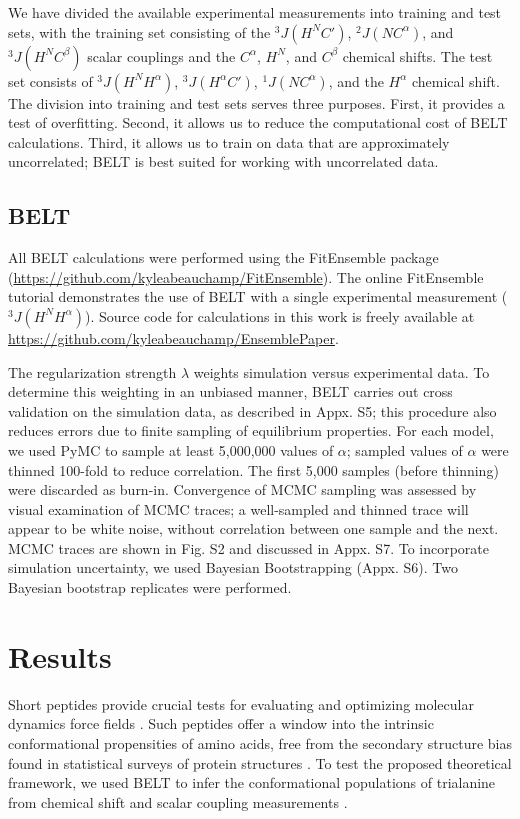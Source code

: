 \documentclass[journal=jacsat,manuscript=article]{achemso}
\begin{document}
We have divided the available experimental measurements into training and test sets, with the training set consisting of the $^3J(H^N C')$,  $^2J(N C^\alpha)$, and $^3J(H^N C^\beta)$ scalar couplings and the $C^\alpha$, $H^N$, and $C^\beta$ chemical shifts.  The test set consists of $^3J(H^N H^\alpha)$, $^3J(H^\alpha C')$, $^1J(N C^\alpha)$, and the $H^\alpha$ chemical shift.  The division into training and test sets serves three purposes.  First, it provides a test of overfitting.  Second, it allows us to reduce the computational cost of BELT calculations.  Third, it allows us to train on data that are approximately uncorrelated; BELT is best suited for working with uncorrelated data.  

\subsection*{BELT}

All BELT calculations were performed using the FitEnsemble package (\url{https://github.com/kyleabeauchamp/FitEnsemble}).  The online FitEnsemble tutorial demonstrates the use of BELT with a single experimental measurement ($^3J(H^N H^\alpha)$).  Source code for calculations in this work is freely available at \url{https://github.com/kyleabeauchamp/EnsemblePaper}.  

The regularization strength $\lambda$ weights simulation versus experimental data. To determine this weighting in an unbiased manner, BELT carries out cross validation on the simulation data, as described in Appx. S5; this procedure also reduces errors due to finite sampling of equilibrium properties.  For each model, we used PyMC to sample at least 5,000,000 values of $\alpha$; sampled values of $\alpha$ were thinned 100-fold to reduce correlation.  The first 5,000 samples (before thinning) were discarded as burn-in.  Convergence of MCMC sampling was assessed by visual examination of MCMC traces; a well-sampled and thinned trace will appear to be white noise, without correlation between one sample and the next.  MCMC traces are shown in Fig. S2 and discussed in Appx. S7.  To incorporate simulation uncertainty, we used Bayesian Bootstrapping (Appx. S6).  Two Bayesian bootstrap replicates were performed.  

\section*{Results}

Short peptides provide crucial tests for evaluating and optimizing molecular dynamics force fields  \cite{Graf2007,beauchamp2012protein, nerenberg2011, best2008, Grdadolnik2011}.  Such peptides offer a window into the intrinsic conformational propensities of amino acids, free from the secondary structure bias found in statistical surveys of protein structures  \cite{Jha2005}.  To test the proposed  theoretical framework, we used BELT to infer the conformational populations of trialanine from chemical shift and scalar coupling measurements  \cite{Graf2007}.  
\end{document}
